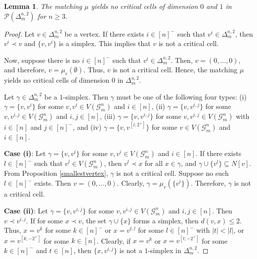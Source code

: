 \documentclass{amsart}
\newtheorem{lemma}[theorem]{Lemma}
\theoremstyle{definition}
\theoremstyle{remark}
\numberwithin{equation}{section}
\newcommand{\D}{\Delta}
\newcommand{\G}{\mathcal{G}}
\newcommand{\cP}{\mathcal{P}}
\begin{document}
\begin{lemma}\label{lemma:critical_1}
	The matching $\mu$ yields no critical cells of dimension $0$ and $1$ in $\cP(\D_m^{n,2})$ for $n\geq 3$.
\end{lemma}
\begin{proof}
	
	Let $v \in \D_m^{n,2}$ be a vertex. If there exists $i \in [n]^{-}$ such that $v^{i} \in \D_m^{n,2}$, then $v^{i} \prec v$ and $\{v,v^{i}\}$ is a simplex. This implies that $v$ is not a critical cell. 
	
	Now, suppose there is no $i \in [n]^{-}$ such that $v^{i} \in \D_m^{n,2}$. Then, $v = (0, \ldots, 0)$, and therefore, 
$v = \mu_{v}(\emptyset)$.   
   Thus, $v$ is not a critical cell. Hence, the matching $\mu$ yields no critical cells of dimension $0$ in $\D_m^{n,2}$.
	
	Let $\gamma \in \Delta_m^{n,2}$ be a $1$-simplex. Then $\gamma$ must be one of the following four types:  
	(i) $\gamma = \{v,v^{i}\}$ for some $v,v^{i} \in V(\G_m^n)$ and $i \in [n]$, 
	(ii) $\gamma = \{v,v^{i,j}\}$ for some $v,v^{i,j} \in V(\G_m^n)$ and $i,j \in [n]$,  
	(iii) $\gamma = \{v,v^{i,j}\}$ for some $v,v^{i,j} \in V(\G_m^n)$ with $i \in [n]$ and $j \in [n]^{-}$, and (iv) $\gamma = \{v,v^{[i;2^{+}]}\}$  for some $v \in V(\G_m^n)$ and $i \in [n]$.

    \vspace{.1cm}
	\noindent \textbf{Case (i)}: Let $\gamma = \{v,v^{i}\}$ for some $v,v^{i} \in V(\G_m^n)$ and $i \in [n]$. If there exists $l \in [n]^{-}$ such that $v^{l} \in V(\mathcal{G}_m^n)$, then $v^{l} \prec x$ for all $x \in \gamma$, and $\gamma \cup \{v^{l}\} \subseteq N[v]$. From Proposition \ref{smallestvertex}, $\gamma$ is not a critical cell. Suppose no such $l \in [n]^{-}$ exists. Then $v = (0, \ldots, 0)$. Clearly, $\gamma = \mu_{v}(\{v^{i}\})$. Therefore, $\gamma$ is not a critical cell.
	
	
    \vspace{.1cm}
	\noindent\textbf{Case (ii)}: Let $\gamma = \{v, v^{i,j}\}$ for some $v, v^{i,j} \in V(\G_m^n)$ and $i,j \in [n]$. Then $v \prec v^{i,j}$.
If for some $x \prec v$, the set $\gamma \cup \{x\}$ forms a simplex, then $d(v, x) \leq 2$. Thus, $x = v^k$ for some $k \in [n]^{-}$ or $x = v^{t,l}$ for some $l \in [n]^{-}$ with $|t| < |l|$, or $x = v^{[k; -2^{+}]}$ for some $k\in [n]$. Clearly, if $x = v^k$ or $x = v^{[t; -2^{+}]}$ for some $k \in [n]^{-}$ and $t \in [n]$, then $\{x, v^{i,j}\}$ is not a $1$-simplex in $\D_m^{n,2}$.


\end{proof}
\end{document}
